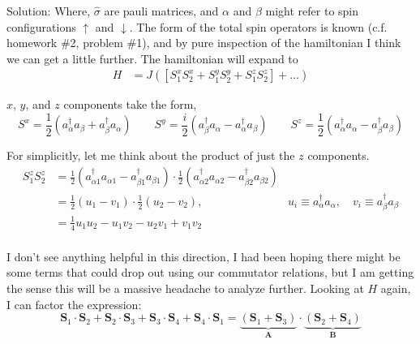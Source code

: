 \begin{homeworkProblem}
\begin{enumerate}[a.]
\begin{callout}{Solution:}
    Where, $\hat{\sigma}$ are pauli matrices, and $\alpha$ and $\beta$ might refer to spin configurations $\uparrow$ and $\downarrow$. The form of the total spin operators is known (c.f. homework \#2, problem \#1), and by pure inspection of the hamiltonian I think we can get a little further. The hamiltonian will expand to 
    \begin{align*}
        H &= J([{S}_{1}^x{S}_{2}^x + {S}_{1}^y{S}_{2}^y + {S}_{1}^z{S}_{2}^z] + \dots)
    \end{align*}

    $x$, $y$, and $z$ components take the form,
    $$
    S^x = \frac{1}{2} \left( a^\dagger_{\alpha} a_{\beta} + a^\dagger_{\beta}a_{\alpha} \right) \qquad
    S^y = \frac{i}{2} \left( a^\dagger_{\beta} a_{\alpha} - a^\dagger_{\alpha}a_{\beta} \right) \qquad
    S^z = \frac{1}{2} \left( a^\dagger_{\alpha} a_{\alpha} - a^\dagger_{\beta}a_{\beta} \right)
    $$

    For simplicitly, let me think about the product of just the $z$ components. 
    \begin{align*}
        S^{z}_1 S^{z}_2 &= \frac{1}{2} \left( a^\dagger_{\alpha1} a_{\alpha1} - a^\dagger_{\beta1}a_{\beta1} \right) \cdot \frac{1}{2} \left( a^\dagger_{\alpha2} a_{\alpha2} - a^\dagger_{\beta2}a_{\beta2} \right) \\ 
                        &= \frac{1}{2} \left( u_{1}-v_{1} \right) \cdot \frac{1}{2} \left( u_{2}-v_{2} \right) , &u_i\equiv a_{\alpha}^{\dagger}a_{\alpha}, \quad v_i\equiv a_{\beta}^{\dagger}a_{\beta} \\ 
                        &= \frac{1}{4} u_{1}u_{2} - u_{1}v_{2} - u_{2}v_{1} + v_{1}v_{2} \\
    \end{align*}

    I don't see anything helpful in this direction, I had been hoping there might be some terms that could drop out using our commutator relations, but I am getting the sense this will be a massive headache to analyze further. 
Looking at $H$ again, I can factor the expression:
$$
\mathbf{S}_1 \cdot \mathbf{S}_2 + \mathbf{S}_2 \cdot \mathbf{S}_3 + \mathbf{S}_3 \cdot \mathbf{S}_4 + \mathbf{S}_4 \cdot \mathbf{S}_1
= \underbrace{(\mathbf{S}_1 + \mathbf{S}_3)}_{\mathbf A}\cdot\underbrace{(\mathbf{S}_2 + \mathbf{S}_4)}_{\mathbf B}
$$
                                                                                                                                                                                                                                                                                

\end{callout}
\end{enumerate}
\end{homeworkProblem}

